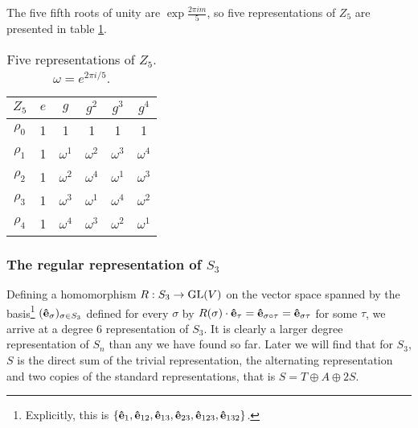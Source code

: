 		\begin{example}
			The five fifth roots of unity are $\exp{\frac{2\pi im}{5}}$, so five representations of $Z_5$ are presented in table \ref{table:Z5}.
			
			\begin{table}[hbt!]
				\begin{tabular}{c | c c c c c}
					\label{table:Z5}
					$Z_5$ & $e$ & $g$        & $g^2$      & $g^3$      & $g^4$      \\ \hline
					$\rho_0$            & 1   & 1          & 1          & 1          & 1          \\
					$\rho_1$            & 1   & $\omega^1$ & $\omega^2$ & $\omega^3$ & $\omega^4$ \\
					$\rho_2$            & 1   & $\omega^2$ & $\omega^4$ & $\omega^1$ & $\omega^3$ \\
					$\rho_3$            & 1   & $\omega^3$ & $\omega^1$ & $\omega^4$ & $\omega^2$ \\
					$\rho_4$            & 1   & $\omega^4$ & $\omega^3$ & $\omega^2$ & $\omega^1$
				\end{tabular}
				\centering
				\caption{Five representations of $Z_5$. $\omega = e^{2 \pi i/5}$.}
			\end{table}
		\end{example}
		
	\subsubsection{The regular representation of $S_3$}\label{sect:regS3}
	
		Defining a homomorphism $R: S_3 \rightarrow \text{GL}(V)$ on the vector space spanned by the basis\footnote{Explicitly, this is $\left\lbrace \mathbf{\hat{e}}_1, \mathbf{\hat{e}}_{12}, \mathbf{\hat{e}}_{13}, \mathbf{\hat{e}}_{23}, \mathbf{\hat{e}}_{123}, \mathbf{\hat{e}}_{132} \right\rbrace$.} $(\mathbf{\hat{e}}_{\sigma})_{\sigma \in S_3}$ defined for every $\sigma$ by $R(\sigma) \cdot \mathbf{\hat{e}}_\tau = \mathbf{\hat{e}}_{\sigma \circ \tau} = \mathbf{\hat{e}}_{\sigma\tau}$ for some $\tau$, we arrive at a degree 6 representation of $S_3$. It is clearly a larger degree representation of $S_n$ than any we have found so far. Later we will find that for $S_3$, $S$ is the direct sum of the trivial representation, the alternating representation and two copies of the standard representations, that is $S = T \oplus A \oplus 2S$.

		
			
			